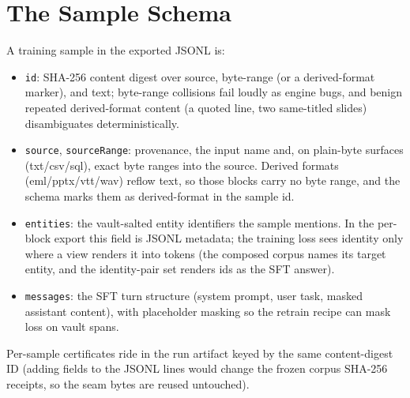 \documentclass{article}
\begin{document}
\section{The Sample Schema}
\label{sec:schema}

A training sample in the exported JSONL is:

\begin{itemize}
  \item \texttt{id}: SHA-256 content digest over source, byte-range (or a derived-format marker), and text; byte-range collisions fail loudly as engine bugs, and benign repeated derived-format content (a quoted line, two same-titled slides) disambiguates deterministically.
  \item \texttt{source}, \texttt{sourceRange}: provenance, the input name and, on plain-byte surfaces (txt/csv/sql), exact byte ranges into the source. Derived formats (eml/pptx/vtt/wav) reflow text, so those blocks carry no byte range, and the schema marks them as derived-format in the sample id.
  \item \texttt{entities}: the vault-salted entity identifiers the sample mentions. In the per-block export this field is JSONL metadata; the training loss sees identity only where a view renders it into tokens (the composed corpus names its target entity, and the identity-pair set renders ids as the SFT answer).
  \item \texttt{messages}: the SFT turn structure (system prompt, user task, masked assistant content), with placeholder masking so the retrain recipe can mask loss on vault spans.
\end{itemize}

Per-sample certificates ride in the run artifact keyed by the same content-digest ID (adding fields to the JSONL lines would change the frozen corpus SHA-256 receipts, so the seam bytes are reused untouched).
\end{document}
